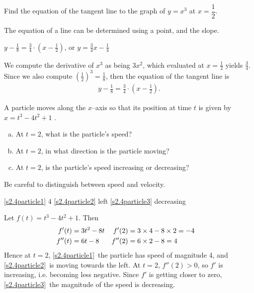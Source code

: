 \begin{Mquestion}[2015Q]
Find the equation of the tangent line to the graph of $y=x^3$ at
$x=\dfrac{1}{2}$.
\end{Mquestion}
\begin{hint} The equation of a line can be determined using a point, and the slope.
\end{hint}
\begin{answer} $y -  \frac{1}{8} = \frac{3}{4}\cdot \left(x-\frac{1}{2}\right)$, or $y= \tfrac{3}{4} x - \tfrac{1}{4}$
\end{answer}
\begin{solution} We compute the derivative of $x^3$ as being $3x^2$, which evaluated at
$x=\frac{1}{2}$ yields $\frac{3}{4}$. Since we also compute
$\left( \frac{1}{2}\right)^3=\frac{1}{8}$, then the equation of the tangent line is
\begin{align*}
y -  \frac{1}{8} = \frac{3}{4}\cdot \left(x-\frac{1}{2}\right).
\end{align*}
\end{solution}


\begin{Mquestion}[1999H]
A particle moves along the $x$--axis so that its position
 at time $t$ is given by $x=t^3-4t^2+1$ .
\begin{enumerate}[(a)]
\item\label{s2.4particle1}At $t=2$, what is the particle's speed?
\item\label{s2.4particle2}At $t=2$, in what direction is the particle moving?
\item\label{s2.4particle3}At $t=2$, is the particle's speed increasing or decreasing?
\end{enumerate}
\end{Mquestion}
\begin{hint} Be careful to distinguish between speed and velocity.
\end{hint}
\begin{answer}
\eqref{s2.4particle1} $4$\qquad
\eqref{s2.4particle2} left \qquad
\eqref{s2.4particle3} decreasing
\end{answer}
\begin{solution}
Let $f(t)=t^3-4t^2+1$. Then
\begin{align*}
f'(t)&=3t^2-8t & f'(2)&=3\times 4-8\times 2=-4\cr
f''(t)&=6t-8 & f''(2)&=6\times 2-8=4\cr
\end{align*}
Hence at $t=2$, \eqref{s2.4particle1}~the particle has speed of magnitude {4}, and \eqref{s2.4particle2}~is
moving {towards the left}.
At $t=2$, $f''(2)>0$, so $f'$ is increasing, i.e.
becoming less negative. Since $f'$ is getting closer to zero, \eqref{s2.4particle3}~the magnitude of the speed is
{decreasing}.
\end{solution}


